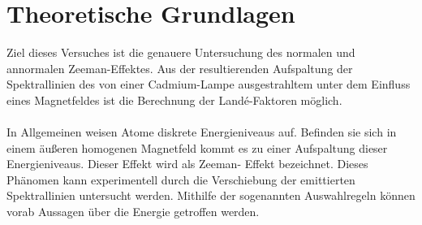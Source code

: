 \section{Theoretische Grundlagen}
Ziel dieses Versuches ist die genauere Untersuchung des normalen und annormalen Zeeman-Effektes. 
Aus der resultierenden Aufspaltung der Spektrallinien des von einer Cadmium-Lampe ausgestrahltem 
unter dem Einfluss eines Magnetfeldes ist die Berechnung der Landé-Faktoren möglich. \\
\\
In Allgemeinen weisen Atome diskrete Energieniveaus auf. Befinden sie sich in einem äußeren homogenen 
Magnetfeld kommt es zu einer Aufspaltung dieser Energieniveaus. Dieser Effekt wird als Zeeman- Effekt
bezeichnet. Dieses Phänomen kann experimentell durch die Verschiebung der emittierten Spektrallinien 
untersucht werden. Mithilfe der sogenannten Auswahlregeln können vorab Aussagen über die 
Energie getroffen werden. \\

